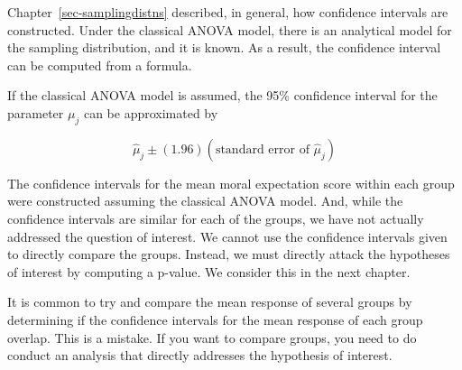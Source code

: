 \documentclass[
  letterpaper,
  DIV=11,
  numbers=noendperiod]{scrreprt}
\theoremstyle{plain}
\theoremstyle{definition}
\theoremstyle{definition}
\theoremstyle{remark}
\begin{document}
Chapter~\ref{sec-samplingdistns} described, in general, how confidence
intervals are constructed. Under the classical ANOVA model, there is an
analytical model for the sampling distribution, and it is known. As a
result, the confidence interval can be computed from a formula.

\begin{tcolorbox}[enhanced jigsaw, breakable, titlerule=0mm, colframe=quarto-callout-note-color-frame, bottomtitle=1mm, opacityback=0, rightrule=.15mm, toptitle=1mm, arc=.35mm, bottomrule=.15mm, left=2mm, title=\textcolor{quarto-callout-note-color}{\faInfo}\hspace{0.5em}{Formula for Confidence Interval Under Classical ANOVA Model}, leftrule=.75mm, coltitle=black, toprule=.15mm, colbacktitle=quarto-callout-note-color!10!white, colback=white, opacitybacktitle=0.6]

If the classical ANOVA model is assumed, the 95\% confidence interval
for the parameter \(\mu_j\) can be approximated by

\[\widehat{\mu}_j \pm (1.96) \left(\text{standard error of } \widehat{\mu}_j\right)\]

\end{tcolorbox}

The confidence intervals for the mean moral expectation score within
each group were constructed assuming the classical ANOVA model. And,
while the confidence intervals are similar for each of the groups, we
have not actually addressed the question of interest. We cannot use the
confidence intervals given to directly compare the groups. Instead, we
must directly attack the hypotheses of interest by computing a p-value.
We consider this in the next chapter.

\begin{tcolorbox}[enhanced jigsaw, breakable, titlerule=0mm, colframe=quarto-callout-warning-color-frame, bottomtitle=1mm, opacityback=0, rightrule=.15mm, toptitle=1mm, arc=.35mm, bottomrule=.15mm, left=2mm, title=\textcolor{quarto-callout-warning-color}{\faExclamationTriangle}\hspace{0.5em}{Warning}, leftrule=.75mm, coltitle=black, toprule=.15mm, colbacktitle=quarto-callout-warning-color!10!white, colback=white, opacitybacktitle=0.6]

It is common to try and compare the mean response of several groups by
determining if the confidence intervals for the mean response of each
group overlap. This is a mistake. If you want to compare groups, you
need to do conduct an analysis that directly addresses the hypothesis of
interest.

\end{tcolorbox}
\end{document}
